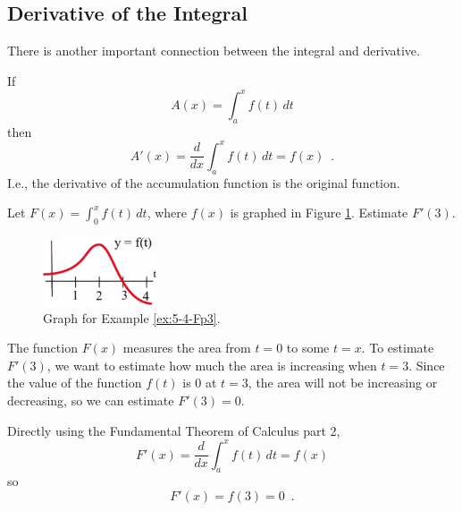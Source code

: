 \subsection{Derivative of the Integral}
There is another important connection between the integral and derivative.

\begin{theorem}
If
$$A(x)=\int_a^x f(t)\,dt$$
then
$$A'(x)=\frac{d}{dx} \int_a^x f(t)\,dt = f(x) \enspace .$$
I.e., the derivative of the accumulation function is the original function.
\end{theorem}
\begin{example}
  \label{ex:5-4-Fp3}
Let $F(x)=\displaystyle\int_0^x f(t)\,dt$, where $f(x)$ is graphed in Figure \ref{fig:5-4-Fp3}. Estimate $F'(3)$.

\begin{figure}[!ht]
  \centering
    \includegraphics[width=0.3\textwidth]{img/chap5/image037.png}
    \caption{Graph for Example \ref{ex:5-4-Fp3}.}
    \label{fig:5-4-Fp3}
\end{figure}

\begin{solution}
The function $F(x)$ measures the area from $t=0$ to some $t=x$. To estimate $F'(3)$, we want to estimate how much the area is increasing when $t=3$. Since the value of the function $f(t)$ is 0 at $t=3$, the area will not be increasing or decreasing, so we can estimate $F'(3)=0$.

Directly using the Fundamental Theorem of Calculus part 2,
$$F'(x) = \frac{d}{dx} \int_a^xf(t)\,dt = f(x) $$
so
$$F'(x)=f(3)=0 \enspace .$$
\end{solution}\end{example}
